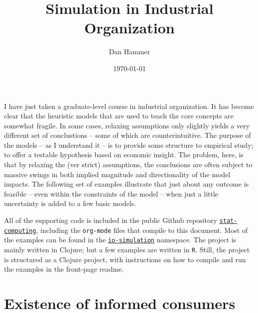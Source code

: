 \documentclass{article}
\title{Simulation in Industrial Organization}
\author{Dan Hammer}
\date{\today}
\begin{document}
\maketitle

\newcommand{\sss}{$s^2$ }
\newcommand{\R}{\texttt{R} }
\newcommand{\ep}{{\bf e}^\prime}
\newcommand{\e}{{\bf e}}
\newcommand{\Rs}{R^2}
\newcommand{\yp}{{\bf y}^\prime}
\newcommand{\y}{{\bf y}}
\newcommand{\X}{{\bf X}}
\newcommand{\Q}{{\bf Q}}
\newcommand{\J}{{\bf J}}
\newcommand{\Xp}{{\bf X}^{\prime}}
\newcommand{\Z}{{\bf Z}}
\newcommand{\Zp}{{\bf Z}^{\prime}}
\renewcommand{\P}{{\bf P}}
\renewcommand{\Pp}{{\bf P}^{\prime}}
\renewcommand{\In}{{\bf I}_n}
\newcommand{\Zin}{(\Zp\Z)^{-1}}
\newcommand{\E}{\mathbb{E}}
\newcommand{\V}{\mathbb{V}}
\newcommand{\sigs}{\sigma^2}


I have just taken a graduate-level course in industrial organization.  It has become clear that the heuristic models that are used to teach the core concepts are somewhat fragile.  In some cases, relaxing assumptions only slightly yields a very different set of conclustions -- some of which are counterintuitive.  The purpose of the models -- as I understand it -- is to provide some structure to empirical study; to offer a testable hypothesis based on economic insight.  The problem, here, is that by relaxing the (ver strict) assumptions, the conclusions are often subject to massive swings in both implied magnitude and directionality of the model impacts.  The following set of examples illustrate that just about any outcome is feasible -- even within the constraints of the model -- when just a little uncertainty is added to a few basic models.  

All of the supporting code is included in the public Github repository \href{https://github.com/danhammer/stat-computing}{\texttt{stat-computing}}, including the \texttt{org-mode} files that compile to this document.  Most of the examples can be found in the \href{https://github.com/danhammer/stat-computing/blob/master/src/computing/io-simulation.clj}{\texttt{io-simulation}} namespace.  The project is mainly written in Clojure; but a few examples are written in \texttt{R}.  Still, the project is structured as a Clojure project, with instructions on how to compile and run the examples in the front-page readme.

\section*{Existence of informed consumers}
\label{sec-1}
\end{document}
